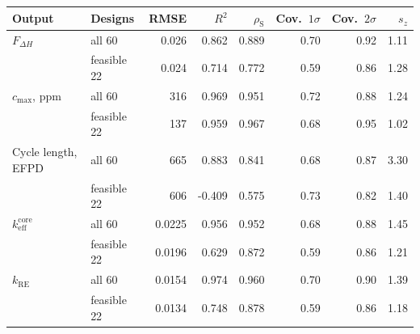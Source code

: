 \begin{tabular}{@{}llrrrrrr@{}}
  \toprule
  Output & Designs & RMSE & $R^2$ & $\rho_\mathrm{S}$ & Cov.\ $1\sigma$ & Cov.\ $2\sigma$ & $s_z$ \\
  \midrule
  $F_{\Delta H}$ & all 60 & 0.026 & 0.862 & 0.889 & 0.70 & 0.92 & 1.11 \\
   & feasible 22 & 0.024 & 0.714 & 0.772 & 0.59 & 0.86 & 1.28 \\
  $c_\mathrm{max}$, ppm & all 60 & 316 & 0.969 & 0.951 & 0.72 & 0.88 & 1.24 \\
   & feasible 22 & 137 & 0.959 & 0.967 & 0.68 & 0.95 & 1.02 \\
  Cycle length, EFPD & all 60 & 665 & 0.883 & 0.841 & 0.68 & 0.87 & 3.30 \\
   & feasible 22 & 606 & -0.409 & 0.575 & 0.73 & 0.82 & 1.40 \\
  $k_\mathrm{eff}^\mathrm{core}$ & all 60 & 0.0225 & 0.956 & 0.952 & 0.68 & 0.88 & 1.45 \\
   & feasible 22 & 0.0196 & 0.629 & 0.872 & 0.59 & 0.86 & 1.21 \\
  $k_\mathrm{RE}$ & all 60 & 0.0154 & 0.974 & 0.960 & 0.70 & 0.90 & 1.39 \\
   & feasible 22 & 0.0134 & 0.748 & 0.878 & 0.59 & 0.86 & 1.18 \\
  \bottomrule
\end{tabular}
